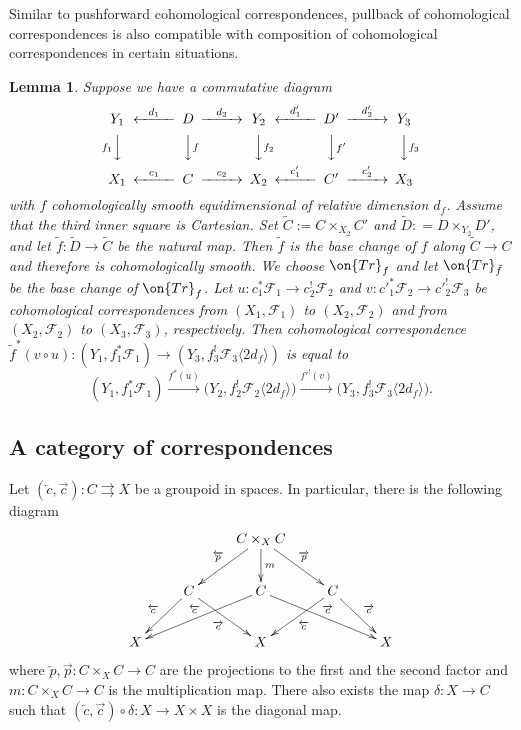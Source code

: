 \documentclass[11pt]{amsart}
\newtheorem{lem}[thm]{Lemma}
\theoremstyle{definition}
\theoremstyle{definition}
\theoremstyle{definition}
\numberwithin{equation}{subsection}
\def\calF{\mathcal{F}}
\newcommand{\Tr}{{\on{Tr}}}
\begin{document}
Similar to pushforward cohomological correspondences, pullback of cohomological correspondences is also compatible with composition of cohomological correspondences in certain situations.
\begin{lem}
\label{AL:pullback compatible with composition}
Suppose we have a commutative diagram
\[
\begin{CD}
Y_1@<d_1<<D@>d_2>>Y_2@<d'_1<<D'@>d'_2>>Y_3\\
@Vf_1VV@VVfV@VVf_2V@VVf'V@VVf_3V\\
X_1@<c_1<< C@>c_2>> X_2@<c'_1<< C'@>c'_2>> X_3
\end{CD}
\]
with $f$ cohomologically smooth equidimensional of relative dimension $d_f$. Assume that the third inner square is Cartesian.
Set $ \widetilde C := C \times_{X_2} C'$ and $\widetilde D: = D \times_{Y_2} D'$, and let $\tilde f:\tilde D\to\tilde C$ be the natural map. Then $\tilde f$ is the base change of $f$ along $\tilde C\to C$ and therefore is cohomologically smooth. We choose $\Tr_f$ and let $\Tr_{\tilde f}$ be the base change of $\Tr_f$.
Let $u: c_1^*\calF_1 \to c_2^!\calF_2$ and $v: c'^*_1\calF_2 \to c'^!_2 \calF_3$ be cohomological correspondences from $(X_1, \calF_1)$ to $(X_2, \calF_2)$ and  from $(X_2, \calF_2)$ to $(X_3, \calF_3)$, respectively. Then cohomological correspondence $\tilde f^*(v\circ u): (Y_1, f_1^*\calF_1) \to (Y_3, f_3^!\calF_3\langle 2d_f\rangle )$ is equal to
\[
(Y_1, f_1^*\calF_1) \xrightarrow{f^*(u)} \big(Y_2, f_2^!\calF_2\langle 2d_f\rangle \big) \xrightarrow{f'^!(v)} \big(Y_3, f_3^!\calF_3\langle 2d_f\rangle \big).
\]
\end{lem}






\subsection{A category of correspondences}\label{SS: cat of corr}
Let $(\overleftarrow{c},\overrightarrow{c}): C\rightrightarrows X$ be a groupoid in spaces. In particular, there is the following diagram
\begin{equation*}
\label{E: diagram}
\xymatrix{
&& C\times_XC\ar_{\overleftarrow{p}}[ld]\ar^{\overrightarrow{p}}[dr]\ar^m[d]& &\\
&C\ar_{\overleftarrow{c}}[ld]\ar_{\overrightarrow{c}}[rd]& C\ar_{\overleftarrow{c}}[lld]\ar^{\overrightarrow{c}}[rrd]&C\ar^{\overleftarrow{c}}[ld]\ar^{\overrightarrow{c}}[rd]&\\
X&&X&&X
}
\end{equation*}
where $\overleftarrow{p},\overrightarrow{p}: C\times_XC\to C$ are the projections to the first and the second factor and $m: C\times_XC\to C$ is the multiplication map. There also exists the map
 $\delta: X\to C$ such that $(\overleftarrow{c},\overrightarrow{c})\circ \delta:X\to X\times X$ is the diagonal map. 
\end{document}
